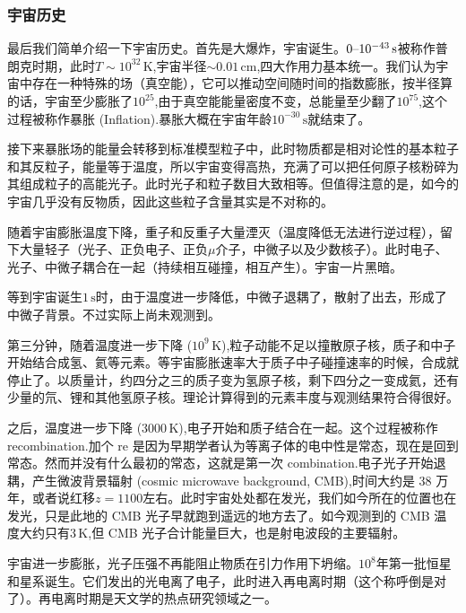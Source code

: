 \documentclass[../天体物理基础.tex]{subfiles}
\begin{document}
\subsubsection{宇宙历史}
最后我们简单介绍一下宇宙历史。首先是大爆炸，宇宙诞生。$0\text{\textendash}10^{-43}\,\mathrm{s}$被称作普朗克时期，此时$T\sim10^{32}\,\mathrm{K}$,宇宙半径$\sim0.01\,\mathrm{cm}$,四大作用力基本统一。我们认为宇宙中存在一种特殊的场（真空能），它可以推动空间随时间的指数膨胀，按半径算的话，宇宙至少膨胀了$10^{25}$,由于真空能能量密度不变，总能量至少翻了$10^{75}$,这个过程被称作暴胀 (Inflation).暴胀大概在宇宙年龄$10^{-30}\,\mathrm{s}$就结束了。

接下来暴胀场的能量会转移到标准模型粒子中，此时物质都是相对论性的基本粒子和其反粒子，能量等于温度，所以宇宙变得高热，充满了可以把任何原子核粉碎为其组成粒子的高能光子。此时光子和粒子数目大致相等。但值得注意的是，如今的宇宙几乎没有反物质，因此这些粒子含量其实是不对称的。

随着宇宙膨胀温度下降，重子和反重子大量湮灭（温度降低无法进行逆过程），留下大量轻子（光子、正负电子、正负$\mu$介子，中微子以及少数核子）。此时电子、光子、中微子耦合在一起（持续相互碰撞，相互产生）。宇宙一片黑暗。

等到宇宙诞生$1\,\mathrm{s}$时，由于温度进一步降低，中微子退耦了，散射了出去，形成了中微子背景。不过实际上尚未观测到。

第三分钟，随着温度进一步下降 ($10^{9}\,\mathrm{K}$),粒子动能不足以撞散原子核，质子和中子开始结合成氢、氦等元素。等宇宙膨胀速率大于质子中子碰撞速率的时候，合成就停止了。以质量计，约四分之三的质子变为氢原子核，剩下四分之一变成氦，还有少量的氘、锂和其他氢原子核。理论计算得到的元素丰度与观测结果符合得很好。

之后，温度进一步下降 ($3000\,\mathrm{K}$),电子开始和质子结合在一起。这个过程被称作 recombination.加个 re 是因为早期学者认为等离子体的电中性是常态，现在是回到常态。然而并没有什么最初的常态，这就是第一次 combination.电子光子开始退耦，产生微波背景辐射 (cosmic microwave background, CMB),时间大约是 38 万年，或者说红移$z=1100$左右。此时宇宙处处都在发光，我们如今所在的位置也在发光，只是此地的 CMB 光子早就跑到遥远的地方去了。如今观测到的 CMB 温度大约只有$3\,\mathrm{K}$,但 CMB 光子合计能量巨大，也是射电波段的主要辐射。

宇宙进一步膨胀，光子压强不再能阻止物质在引力作用下坍缩。$10^{8}$年第一批恒星和星系诞生。它们发出的光电离了电子，此时进入再电离时期（这个称呼倒是对了）。再电离时期是天文学的热点研究领域之一。
\end{document}
